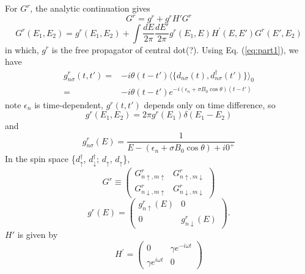 \documentclass[11pt,a4paper]{article}
\begin{document}
For $G^{r}$, the analytic continuation gives
\begin{equation}
G^{r}=g^{r}+g^{r} H' G^{r}
\end{equation}
\begin{equation}
G^{r}(E_{1}, E_{2})=g^{r}(E_{1}, E_{2})+\int\frac{dE}{2\pi}\frac{dE'}{2\pi}g^{r}(E_{1}, E) H^{'}(E, E') G^{r}(E', E_{2})
\label{eq:Gr}
\end{equation}
in which, $g^{r}$ is the free propagator of central dot(?). Using Eq. (\ref{eq:part1}), we have
\begin{equation}
\begin{split}
g_{n\sigma}^{r}(t,t') =& -i\theta(t-t')\langle \{d_{n\sigma}(t),d_{n\sigma}^{\dag}(t')\} \rangle_{0} \\
=&-i\theta(t-t') e^{-i(\epsilon_{n}+\sigma B_{0} \cos \theta) (t-t')}
\end{split}
\end{equation}
note $\epsilon_{n}$ is time-dependent, $g^{r}(t,t')$ depends only on time difference, so
\begin{equation}
g^{r}\left(E_{1}, E_{2}\right) = 2\pi g^{r}\left(E_{1}\right) \delta(E_{1}-E_{2})
\end{equation}
and
\begin{equation}
g_{n\sigma}^{r}(E) = \frac{1}{E-(\epsilon_{n}+\sigma B_{0} \cos \theta)+i 0^{+}}
\end{equation}
In the spin space \{$d_{\uparrow}^{\dag}$, $d_{\downarrow}^{\dag}$; $d_{\uparrow}$, $d_{\uparrow}$\},
\begin{equation}
G^{r}\equiv\left(\begin{array}{cc}
G_{n\uparrow,m\uparrow}^{r} & G_{n\uparrow,m\downarrow}^{r} \\
G_{n\downarrow,m\uparrow}^{r} & G_{n\downarrow,m\downarrow}^{r}
\end{array}\right)
\end{equation}
\begin{equation}
g^{r}(E)=\left(\begin{array}{cc}
g_{n\uparrow}^{r}(E) &0 \\
0 & g_{n\downarrow}^{r}(E)
\end{array}\right).
\end{equation}
$H'$ is given by
\begin{equation}
H^{\prime}=\left(\begin{array}{cc}
0 & \gamma e^{-i \omega t} \\
\gamma e^{i \omega t} & 0
\end{array}\right)
\end{equation}
\end{document}
